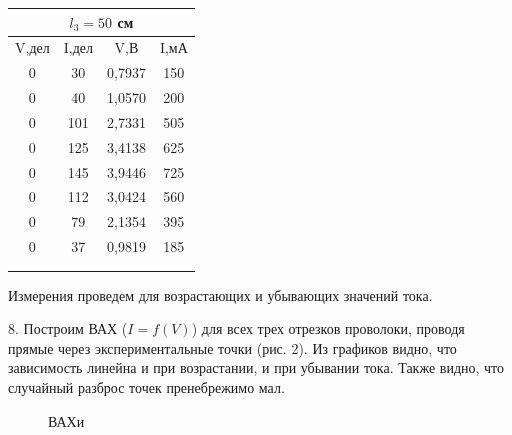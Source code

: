 \documentclass[14pt]{article}
\begin{document}
	\begin{tabular}[l]{|*{4}{c|}}
	\hline
	\multicolumn{4}{|c|}{$l_3 = 50$ см}\\
	\hline
	V,дел & I,дел & V,В & I,мА\\ 
	\hline 
	0 & 30 & 0,7937 & 150 \\ 
	\hline 
	0 & 40 & 1,0570 & 200 \\ 
	\hline 
	0 & 101 & 2,7331 & 505 \\ 
	\hline 
	0 & 125 & 3,4138 & 625 \\ 
	\hline 
	0 & 145 & 3,9446 & 725 \\ 
	\hline 
	0 & 112 & 3,0424 & 560 \\ 
	\hline 
	0 & 79 & 2,1354 & 395 \\ 
	\hline 
	0 & 37 & 0,9819 & 185 \\ 
	\hline
	& & & \\
	\hline
	& & & \\
	\hline 
	\end{tabular} 
	
	\vspace{0.5cm}
	Измерения проведем для возрастающих и убывающих значений тока. 
	
	\vspace{0.5cm}
	8. Построим ВАХ ($I = f(V)$) для всех трех отрезков проволоки, проводя прямые через экспериментальные точки (рис. 2). Из графиков 		видно, что зависимость линейна и при возрастании, и при убывании тока. Также видно, что случайный разброс точек пренебрежимо мал.
	
	\newpage
	\vspace{1cm}
	\begin{figure}[h!]
		\caption{ВАХи}
		\label{fig:image}
	\end{figure}
	
\end{document}
